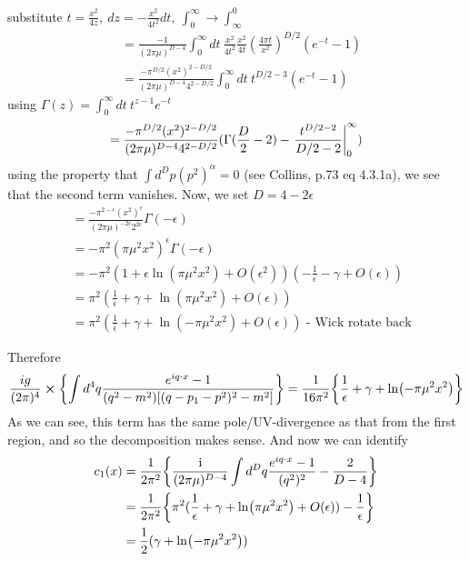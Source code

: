 \documentclass{article}
\begin{document}
substitute $t = \frac{x^2}{4z},\ dz=-\frac{x^2}{4t^2}dt,\ \int_0^\infty \rightarrow \int_\infty^0$
\begin{equation}
\begin{split}    
    &= \frac{-1}{(2\pi\mu)^{D-4}}\int_0^\infty  dt\ \frac{x^2}{4t^2} \frac{x^2}{4t}
    (\frac{4\pi t}{x^2})^{D/2}(e^{-t}-1)\\
    &= \frac{-\pi^{D/2}(x^2)^{2-D/2}}{(2\pi\mu)^{D-4}4^{2-D/2}}\int_0^\infty  dt\ t^{D/2-3}(e^{-t}-1)
\end{split}
\end{equation}
using $\Gamma(z)=\int_0^\infty dt\ t^{z-1}e^{-t}$
\begin{equation}
    = \frac{-\pi^{D/2}(x^2)^{2-D/2}}{(2\pi\mu)^{D-4}4^{2-D/2}}(\Gamma(\frac{D}{2}-2)-\eval{\frac{t^{D/2-2}}{D/2-2}}_0^\infty )
\end{equation}
using the property that $\int d^Dp(p^2)^\alpha = 0$ (see Collins, p.73 eq 4.3.1a), we see that the second term vanishes. Now, we set $D=4-2\epsilon$
\begin{equation}
\begin{split}
    &= \frac{-\pi^{2-\epsilon}(x^2)^{\epsilon}}{(2\pi\mu)^{-2\epsilon}2^{2\epsilon}}\Gamma(-\epsilon)\\
    &= -\pi^2(\pi\mu^2 x^2)^\epsilon\Gamma(-\epsilon)\\
    &= -\pi^2 (1+\epsilon \ln(\pi \mu^2 x^2)+O(\epsilon^2))(-\frac{1}{\epsilon}-\gamma+O(\epsilon))\\
    &= \pi^2(\frac{1}{\epsilon}+\gamma+\ln(\pi\mu^2 x^2)+O(\epsilon))\\
    &= \pi^2(\frac{1}{\epsilon}+\gamma+\ln(-\pi\mu^2 x^2)+O(\epsilon))\text{ - Wick rotate back}
\end{split}
\end{equation}

Therefore
\begin{equation}
    \frac{ig}{(2\pi)^4}\cross\qty{\int d^4q \frac{e^{iq\cdot x}-1}{(q^2-m^2)[(q-p_1-p^2)^2-m^2]}} = \frac{1}{16\pi^2}\qty{\frac{1}{\epsilon}+\gamma+\ln(-\pi\mu^2 x^2)}
\end{equation}
As we can see, this term has the same pole/UV-divergence as that from the first region, and so the decomposition makes sense. And now we can identify
\begin{equation}
\begin{split}
    c_1(x) &= \frac{1}{2\pi^2} \qty{\frac{\text{i}}{(2\pi\mu)^{D-4}}\int d^Dq\frac{e^{iq\cdot x}-1}{(q^2)^2}-\frac{2}{D-4}}\\
    &=\frac{1}{2\pi^2} \qty{\pi^2(\frac{1}{\epsilon}+\gamma+\ln(\pi\mu^2 x^2)+O(\epsilon))-\frac{1}{\epsilon}}\\
    &=\frac{1}{2}(\gamma+\ln(-\pi\mu^2 x^2))
\end{split}
\end{equation}
\end{document}
